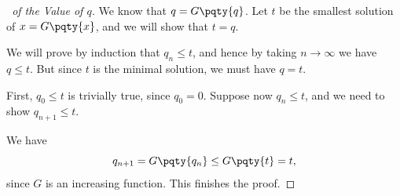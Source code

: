 \begin{proof}[\proofname\ of the Value of \(q\)]
    We know that \(q = G\pqty{q}\). Let \(t\) be the smallest solution of \(x = G\pqty{x}\), and we will show that \(t = q\).

    We will prove by induction that \(q_n \leq t\), and hence by taking \(n \to \infty\) we have \(q \leq t\). But since \(t\) is the minimal solution, we must have \(q = t\).

    First, \(q_0 \leq t\) is trivially true, since \(q_0 = 0\). Suppose now \(q_n \leq t\), and we need to show \(q_{n + 1} \leq t\).

    We have
    \[
        q_{n + 1} = G\pqty{q_n} \leq G\pqty{t} = t,
    \]
    since \(G\) is an increasing function. This finishes the proof.
\end{proof}

